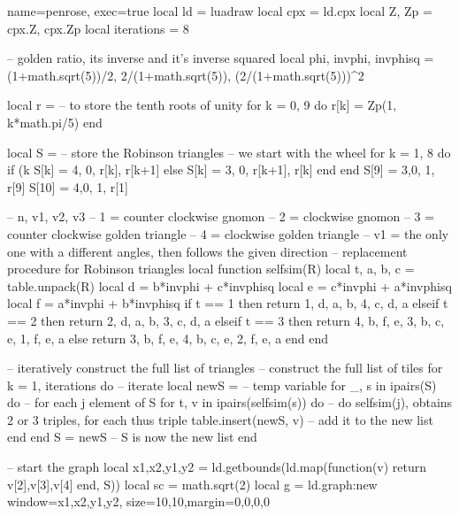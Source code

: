 \documentclass[tikz]{standalone}
\begin{document}
\begin{luadraw}{name=penrose, exec=true}
local ld = luadraw
local cpx = ld.cpx
local Z, Zp = cpx.Z, cpx.Zp
local iterations = 8

 -- golden ratio, its inverse and it's inverse squared
local phi, invphi, invphisq = (1+math.sqrt(5))/2, 2/(1+math.sqrt(5)), (2/(1+math.sqrt(5)))^2

local r = {} -- to store the tenth roots of unity
for k = 0, 9 do
    r[k] = Zp(1, k*math.pi/5)
end

local S = {} -- store the Robinson triangles
-- we start with the wheel
for k = 1, 8 do
    if (k %
        S[k] = {4, 0, r[k], r[k+1]}
    else
        S[k] = {3, 0, r[k+1], r[k]}
    end
end
S[9] = {3,0, 1, r[9]}
S[10] = {4,0, 1, r[1]}

-- {n, v1, v2, v3}
-- 1 = counter clockwise gnomon
-- 2 = clockwise gnomon
-- 3 = counter clockwise golden triangle
-- 4 = clockwise golden triangle
-- v1 = the only one with a different angles, then follows the given direction
-- replacement procedure for Robinson triangles
local function selfsim(R)
    local t, a, b, c = table.unpack(R)
    local d = b*invphi + c*invphisq
    local e = c*invphi + a*invphisq
    local f = a*invphi + b*invphisq
    if t == 1 then
        return {{1, d, a, b}, {4, c, d, a}}
    elseif t == 2 then
        return {{2, d, a, b}, {3, c, d, a}}
    elseif t == 3 then
        return {{4, b, f, e}, {3, b, c, e}, {1, f, e, a}}
    else
        return {{3, b, f, e}, {4, b, c, e}, {2, f, e, a}}
    end
end

-- iteratively construct the full list of triangles
-- construct the full list of tiles
for k = 1, iterations do -- iterate
    local newS = {} -- temp variable
    for _, s in ipairs(S) do -- for each j element of S
        for t, v in ipairs(selfsim(s)) do -- do selfsim(j), obtains 2 or 3 triples, for each thus triple
            table.insert(newS, v) -- add it to the new list
        end
    end
    S = newS -- S is now the new list
end

-- start the graph
local x1,x2,y1,y2 = ld.getbounds(ld.map(function(v) return {v[2],v[3],v[4]} end, S))
local sc = math.sqrt(2)
local g = ld.graph:new{ window={x1,x2,y1,y2}, size={10,10},margin={0,0,0,0}}


\end{luadraw}
\end{document}
